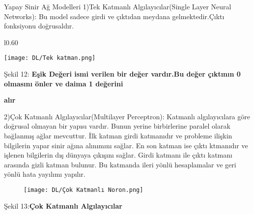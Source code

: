 \documentclass{beamer}                                                                                          %
\begin{document}
    \begin{frame}{Yapay Sinir Ağ Modelleri}
     	\color{myred1}
     	    \vspace{1 pt}
     	    1)Tek Katmanlı Algılayıcılar(Single Layer Neural Networks): \color{default} \newline \justifying Bu model sadece girdi ve çıktıdan meydana gelmektedir.Çıktı fonksiyonu doğrusaldır.\newline
        \begin{wrapfigure}{l}{0.60\textwidth}
            \vspace{0 pt}
                \begin{center}
                    \texttt{[image: DL/Tek katman.png]}
                \end{center}
            \vspace{-20pt}
            \vspace{-10pt}
        \end{wrapfigure}
        \newline \newline \newline
	    \color{myred1}Şekil 12:\color{black} \textbf{Eşik Değeri ismi verilen bir değer vardır.Bu değer çıktının 0 olmasını önler ve daima 1 değerini}\par \hspace{216}\textbf{alır}
    \end{frame}
    

	\begin{frame}
		\color{myred1}
		    2)Çok Katmanlı Algılayıcılar(Multilayer Perceptron):\color{black} \newline \justifying Katmanlı algılayıcılara göre doğrusal olmayan bir yapısı vardır. Bunun yerine birbirlerine paralel olarak bağlanmış ağlar mevcuttur. İlk katman girdi katmanıdır ve probleme ilişkin bilgilerin yapar sinir ağına alınımını sağlar. En son katman ise çıktı ktmanıdır ve işlenen bilgilerin dış dünyaya çıkışını sağlar. Girdi katmanı ile çıktı katmanı arasında gizli katman bulunur. Bu katmanda  ileri yönlü hesaplamalar ve geri yönlü hata yayılımı yapılır.
		        \begin{figure}
	                \centering
	                \texttt{[image: DL/Çok Katmanlı Noron.png]}
	                
	            \end{figure}
	            \centering
	            \color{myred1}Şekil 13:\color{black}\textbf{Çok Katmanlı Algılayıcılar}
    \end{frame}
    
\end{document}

